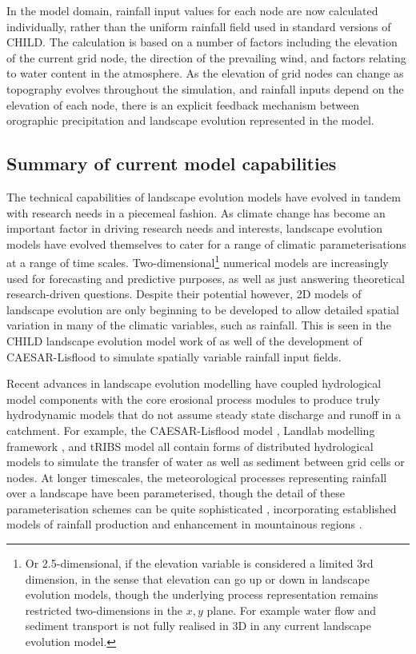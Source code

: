 In the model domain, rainfall input values for each node are now calculated individually, rather than the uniform rainfall field used in standard versions of CHILD. The calculation is based on a number of factors including the elevation of the current grid node, the direction of the prevailing wind, and factors relating to water content in the atmosphere. As the elevation of grid nodes can change as topography evolves throughout the simulation, and rainfall inputs depend on the elevation of each node, there is an explicit feedback mechanism between orographic precipitation and landscape evolution represented in the model. 

\subsection{Summary of current model capabilities}

The technical capabilities of landscape evolution models have evolved in tandem with research needs in a piecemeal fashion. As climate change has become an important factor in driving research needs and interests, landscape evolution models have evolved themselves to cater for a range of climatic parameterisations at a range of time scales. Two-dimensional\footnote{Or 2.5-dimensional, if the elevation variable is considered a limited 3rd dimension, in the sense that elevation can go up or down in landscape evolution models, though the underlying process representation remains restricted two-dimensions in the \(x,y\) plane. For example water flow and sediment transport is not fully realised in 3D in any current landscape evolution model.} numerical models are increasingly used for forecasting and predictive purposes, as well as just answering theoretical research-driven questions. Despite their potential however, 2D models of landscape evolution are only beginning to be developed to allow detailed spatial variation in many of the climatic variables, such as rainfall. This is seen in the CHILD landscape evolution model work of \citet{han2015measuring} as well of the development of CAESAR-Lisflood \citep{coulthard2016sensitivity,coulthard2017caesarlisflood} to simulate spatially variable rainfall input fields. 

Recent advances in landscape evolution modelling have coupled hydrological model components with the core erosional process modules to produce truly hydrodynamic models that do not assume steady state discharge and runoff in a catchment. For example, the CAESAR-Lisflood model \citep{Coulthard2013}, Landlab modelling framework \citep{hobley2017creative}, and tRIBS model \citep{vivoni2011real} all contain forms of distributed hydrological models to simulate the transfer of water as well as sediment between grid cells or nodes. At longer timescales, the meteorological processes representing rainfall over a landscape have been parameterised, though the detail of these parameterisation schemes can be quite sophisticated \citep[e.g.][]{han2015measuring}, incorporating established models of rainfall production and enhancement in mountainous regions \citep{Roe2002,Roe2003,smith2004linear}.

